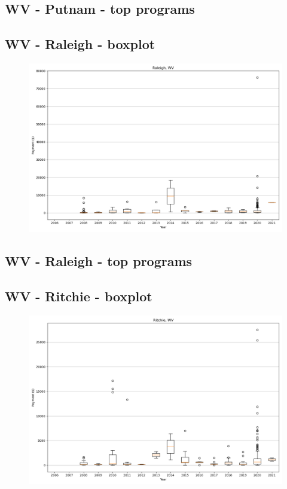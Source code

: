 \subsection*{WV - Putnam - top programs}

\newpage
\subsection*{WV - Raleigh - boxplot}
\begin{figure}[h]
\centering
\includegraphics[width=7in]{../output/boxplots/counties/Raleigh-WV_boxplot.png}
\end{figure}


\subsection*{WV - Raleigh - top programs}

\newpage
\subsection*{WV - Ritchie - boxplot}
\begin{figure}[h]
\centering
\includegraphics[width=7in]{../output/boxplots/counties/Ritchie-WV_boxplot.png}
\end{figure}


